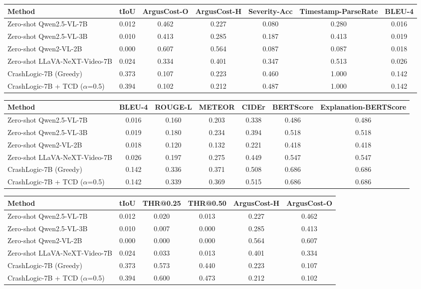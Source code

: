 \begin{tabular}{lcccccc}
\toprule
Method & tIoU & ArgusCost-O & ArgusCost-H & Severity-Acc & Timestamp-ParseRate & BLEU-4 \\
\midrule
Zero-shot Qwen2.5-VL-7B & 0.012 & 0.462 & 0.227 & 0.080 & 0.280 & 0.016 \\
Zero-shot Qwen2.5-VL-3B & 0.010 & 0.413 & 0.285 & 0.187 & 0.413 & 0.019 \\
Zero-shot Qwen2-VL-2B & 0.000 & 0.607 & 0.564 & 0.087 & 0.087 & 0.018 \\
Zero-shot LLaVA-NeXT-Video-7B & 0.024 & 0.334 & 0.401 & 0.347 & 0.513 & 0.026 \\
CrashLogic-7B (Greedy) & 0.373 & 0.107 & 0.223 & 0.460 & 1.000 & 0.142 \\
CrashLogic-7B + TCD ($\alpha$=0.5) & 0.394 & 0.102 & 0.212 & 0.487 & 1.000 & 0.142 \\
\bottomrule
\end{tabular}


\begin{tabular}{lcccccc}
\toprule
Method & BLEU-4 & ROUGE-L & METEOR & CIDEr & BERTScore & Explanation-BERTScore \\
\midrule
Zero-shot Qwen2.5-VL-7B & 0.016 & 0.160 & 0.203 & 0.338 & 0.486 & 0.486 \\
Zero-shot Qwen2.5-VL-3B & 0.019 & 0.180 & 0.234 & 0.394 & 0.518 & 0.518 \\
Zero-shot Qwen2-VL-2B & 0.018 & 0.120 & 0.132 & 0.221 & 0.418 & 0.418 \\
Zero-shot LLaVA-NeXT-Video-7B & 0.026 & 0.197 & 0.275 & 0.449 & 0.547 & 0.547 \\
CrashLogic-7B (Greedy) & 0.142 & 0.336 & 0.371 & 0.508 & 0.686 & 0.686 \\
CrashLogic-7B + TCD ($\alpha$=0.5) & 0.142 & 0.339 & 0.369 & 0.515 & 0.686 & 0.686 \\
\bottomrule
\end{tabular}


\begin{tabular}{lccccc}
\toprule
Method & tIoU & THR@0.25 & THR@0.50 & ArgusCost-H & ArgusCost-O \\
\midrule
Zero-shot Qwen2.5-VL-7B & 0.012 & 0.020 & 0.013 & 0.227 & 0.462 \\
Zero-shot Qwen2.5-VL-3B & 0.010 & 0.007 & 0.000 & 0.285 & 0.413 \\
Zero-shot Qwen2-VL-2B & 0.000 & 0.000 & 0.000 & 0.564 & 0.607 \\
Zero-shot LLaVA-NeXT-Video-7B & 0.024 & 0.033 & 0.013 & 0.401 & 0.334 \\
CrashLogic-7B (Greedy) & 0.373 & 0.573 & 0.440 & 0.223 & 0.107 \\
CrashLogic-7B + TCD ($\alpha$=0.5) & 0.394 & 0.600 & 0.473 & 0.212 & 0.102 \\
\bottomrule
\end{tabular}


